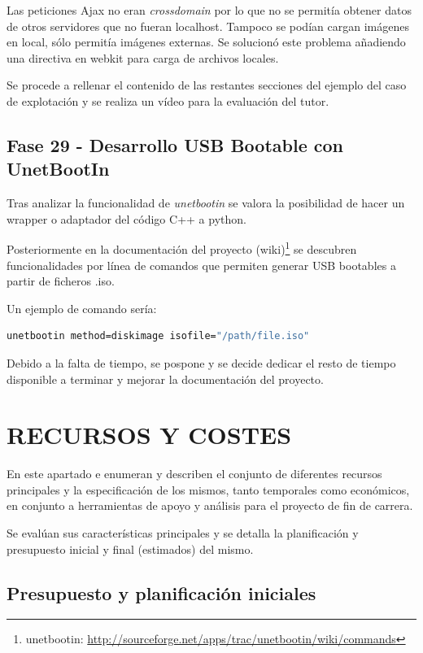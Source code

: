 Las peticiones Ajax no eran \emph{crossdomain} por lo que no se permitía obtener
datos de otros servidores que no fueran localhost. Tampoco se podían cargan
imágenes en local, sólo permitía imágenes externas. Se solucionó este problema
añadiendo una directiva en webkit para carga de archivos locales.

Se procede a rellenar el contenido de las restantes secciones del ejemplo del
caso de explotación y se realiza un vídeo para la evaluación del tutor.

\subsection{Fase 29 - Desarrollo USB Bootable con UnetBootIn}

Tras analizar la funcionalidad de \emph{unetbootin} se valora la posibilidad de
hacer un wrapper o adaptador del código C++ a python.

Posteriormente en la documentación del proyecto (wiki)\footnote{unetbootin:
\url{http://sourceforge.net/apps/trac/unetbootin/wiki/commands}} se
descubren funcionalidades por línea de comandos que permiten generar USB
bootables a partir de ficheros .iso.

\newpage

Un ejemplo de comando sería:

\begin{lstlisting}[language={Bash}, texcl=false, label={lst:unetbootin},
caption={Copia de fichero .iso con unetbootin}] 
unetbootin method=diskimage isofile="/path/file.iso"
\end{lstlisting}

Debido a la falta de tiempo, se pospone y se decide dedicar el resto de tiempo
disponible a terminar y mejorar la documentación del proyecto.

\section{\uppercase{Recursos y costes}}

En este apartado e enumeran y describen el conjunto de diferentes recursos
principales y la especificación de los mismos, tanto temporales como económicos,
en conjunto a herramientas de apoyo y análisis para el proyecto de fin de carrera.

Se evalúan sus características principales y se detalla la planificación y
presupuesto inicial y final (estimados) del mismo.

\subsection{Presupuesto y planificación iniciales}

